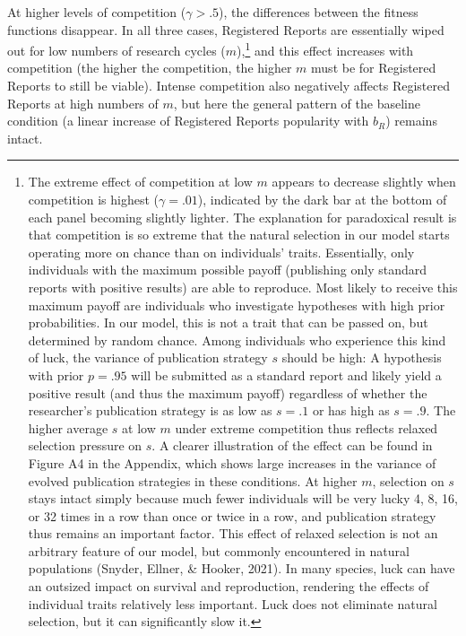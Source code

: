 \documentclass[
  ,man,mask,floatsintext]{apa6}
\begin{document}
At higher levels of competition (\(\gamma > .5\)), the differences between the fitness functions disappear.
In all three cases, Registered Reports are essentially wiped out for low numbers of research cycles (\(m\)),\footnote{The extreme effect of competition at low \(m\) appears to decrease slightly when competition is highest (\(\gamma = .01\)), indicated by the dark bar at the bottom of each panel becoming slightly lighter.
  The explanation for paradoxical result is that
  competition is so extreme that the natural selection in our model starts operating more on chance than on individuals' traits.
  Essentially, only individuals with the maximum possible payoff (publishing only standard reports with positive results) are able to reproduce.
  Most likely to receive this maximum payoff are individuals who investigate hypotheses with high prior probabilities.
  In our model, this is not a trait that can be passed on, but determined by random chance.
  Among individuals who experience this kind of luck, the variance of publication strategy \(s\) should be high:
  A hypothesis with prior \(p = .95\) will be submitted as a standard report and likely yield a positive result (and thus the maximum payoff) regardless of whether the researcher's publication strategy is as low as \(s = .1\) or has high as \(s = .9\).
  The higher average \(s\) at low \(m\) under extreme competition thus reflects relaxed selection pressure on \(s\).
  A clearer illustration of the effect can be found in Figure A4 in the Appendix, which shows large increases in the variance of evolved publication strategies in these conditions.
  At higher \(m\), selection on \(s\) stays intact simply because much fewer individuals will be very lucky 4, 8, 16, or 32 times in a row than once or twice in a row, and publication strategy thus remains an important factor.
  This effect of relaxed selection is not an arbitrary feature of our model, but commonly encountered in natural populations (Snyder, Ellner, \& Hooker, 2021).
  In many species, luck can have an outsized impact on survival and reproduction, rendering the effects of individual traits relatively less important.
  Luck does not eliminate natural selection, but it can significantly slow it.
} and this effect increases with competition (the higher the competition, the higher \(m\) must be for Registered Reports to still be viable).
Intense competition also negatively affects Registered Reports at high numbers of \(m\), but here the general pattern of the baseline condition (a linear increase of Registered Reports popularity with \(b_{R}\)) remains intact.
\end{document}
